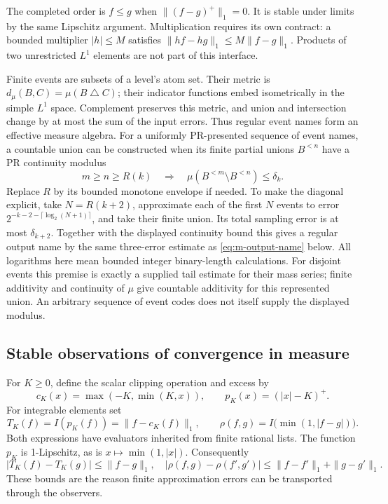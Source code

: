 The completed order is $f\le g$ when $\|(f-g)^+\|_1=0$.  It is stable
under limits by the same Lipschitz argument.  Multiplication requires its
own contract: a bounded multiplier $|h|\le M$ satisfies
$\|hf-hg\|_1\le M\|f-g\|_1$.  Products of two unrestricted $L^1$
elements are not part of this interface.

Finite events are subsets of a level's atom set.  Their metric is
$d_\mu(B,C)=\mu(B\mathbin\triangle C)$; their indicator functions embed
isometrically in the simple $L^1$ space.  Complement preserves this metric,
and union and intersection change by at most the sum of the input errors.
Thus regular event names form an effective measure algebra.  For a
uniformly PR-presented sequence of event names, a countable union can be
constructed when its finite partial unions $B^{<n}$ have a PR continuity
modulus
\[
 m\ge n\ge R(k)\quad\Longrightarrow\quad
 \mu(B^{<m}\setminus B^{<n})\le\delta_k.
\]
Replace $R$ by its bounded monotone envelope if needed.  To make the
diagonal explicit, take $N=R(k+2)$, approximate each of the
first $N$ events to error
$2^{-k-2-\lceil\log_2(N+1)\rceil}$, and take their finite union.  Its
total sampling error is at most $\delta_{k+2}$.  Together with the
displayed continuity bound this gives a regular output name by the same
three-error estimate as \eqref{eq:m-output-name} below.  All logarithms
here mean bounded integer binary-length calculations.  For disjoint
events this premise is exactly a supplied tail estimate for their mass
series; finite additivity and continuity of $\mu$ give countable
additivity for this represented union.  An arbitrary sequence of event
codes does not itself supply the displayed modulus.

\subsection{Stable observations of convergence in measure}

For $K\ge0$, define the scalar clipping operation and excess by
\[
 c_K(x)=\max(-K,\min(K,x)),\qquad
 p_K(x)=(|x|-K)^+.
\]
For integrable elements set
\begin{equation}
 T_K(f)=I(p_K(f))=\|f-c_K(f)\|_1,
 \qquad
 \rho(f,g)=I\bigl(\min(1,|f-g|)\bigr).
 \label{eq:m-stable-observers}
\end{equation}
Both expressions have evaluators inherited from finite rational lists.
The function $p_K$ is 1-Lipschitz, as is $x\mapsto\min(1,|x|)$.
Consequently
\begin{equation}
 |T_K(f)-T_K(g)|\le\|f-g\|_1,\quad
 |\rho(f,g)-\rho(f',g')|
 \le\|f-f'\|_1+\|g-g'\|_1.
 \label{eq:m-observer-lipschitz}
\end{equation}
These bounds are the reason finite approximation errors can be transported
through the observers.


